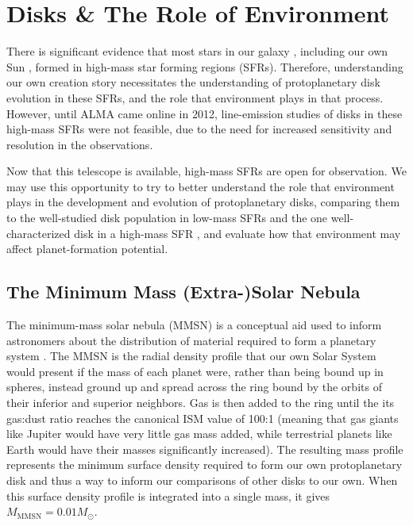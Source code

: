 \section{Disks \& The Role of Environment}


There is significant evidence that most stars in our galaxy \citep{LadaLada2003,Mann2015}, including our own Sun \citep{Gaidos2009,Tachibana2006}, formed in high-mass star forming regions (SFRs). Therefore, understanding our own creation story necessitates the understanding of protoplanetary disk evolution in these SFRs, and the role that environment plays in that process. However, until ALMA came online in 2012, line-emission studies of disks in these high-mass SFRs were not feasible, due to the need for increased sensitivity and resolution in the observations.

Now that this telescope is available, high-mass SFRs are open for observation. We may use this opportunity to try to better understand the role that environment plays in the development and evolution of protoplanetary disks, comparing them to the well-studied disk population in low-mass SFRs \citep[e.g.]{AndrewsWilliams2005,Mann2015} and the one well-characterized disk in a high-mass SFR \citep{Factor2017}, and evaluate how that environment may affect planet-formation potential.



\subsection{The Minimum Mass (Extra-)Solar Nebula}

The minimum-mass solar nebula (MMSN) is a conceptual aid used to inform astronomers about the distribution of material required to form a planetary system \citep{Weidenschilling1977}. The MMSN is the radial density profile that our own Solar System would present if the mass of each planet were, rather than being bound up in spheres, instead ground up and spread across the ring bound by the orbits of their inferior and superior neighbors. Gas is then added to the ring until the its gas:dust ratio reaches the canonical ISM value of 100:1 (meaning that gas giants like Jupiter would have very little gas mass added, while terrestrial planets like Earth would have their masses significantly increased). The resulting mass profile represents the minimum surface density required to form our own protoplanetary disk and thus a way to inform our comparisons of other disks to our own. When this surface density profile is integrated into a single mass, it gives $M_\text{MMSN} = 0.01 M_{\odot}$.

